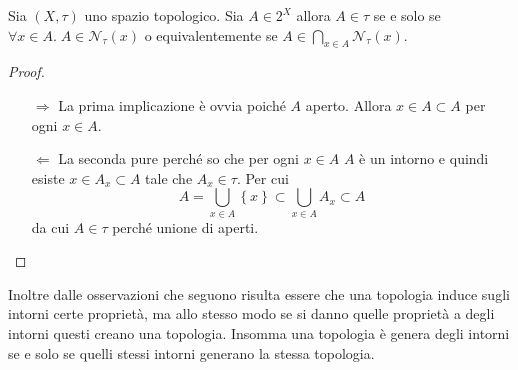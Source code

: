 \begin{proposition}
	Sia $(X,\tau)$ uno spazio topologico. Sia $A \in 2^X$ allora $A \in \tau$ se e solo se $\forall x \in A . \; A \in \mathcal{N}_\tau(x)$ o equivalentemente se $A \in \bigcap_{x \in A} \mathcal{N}_\tau(x)$.
\end{proposition}
\begin{proof}
	\begin{enumerate}
		\item[$\Rightarrow$] La prima implicazione è ovvia poiché $A$ aperto. Allora $x \in A \subset A$ per ogni $x \in A$.
		\item[$\Leftarrow$]	La seconda pure perché so che per ogni $x \in A$ $A$ è un intorno e quindi esiste $x \in A_x \subset A$ tale che $A_x \in \tau$. Per cui  
		\begin{equation*}
			A = \bigcup_{x \in A} \left\{x\right\} \subset \bigcup_{x\in A} A_x \subset A
		\end{equation*}
		da cui $A \in \tau$ perché unione di aperti. 
	\end{enumerate}
\end{proof}

Inoltre dalle osservazioni che seguono risulta essere che una topologia induce sugli intorni certe proprietà, ma allo stesso modo se si danno quelle proprietà a degli intorni questi creano una topologia. Insomma una topologia è genera degli intorni se e solo se quelli stessi intorni generano la stessa topologia. 

